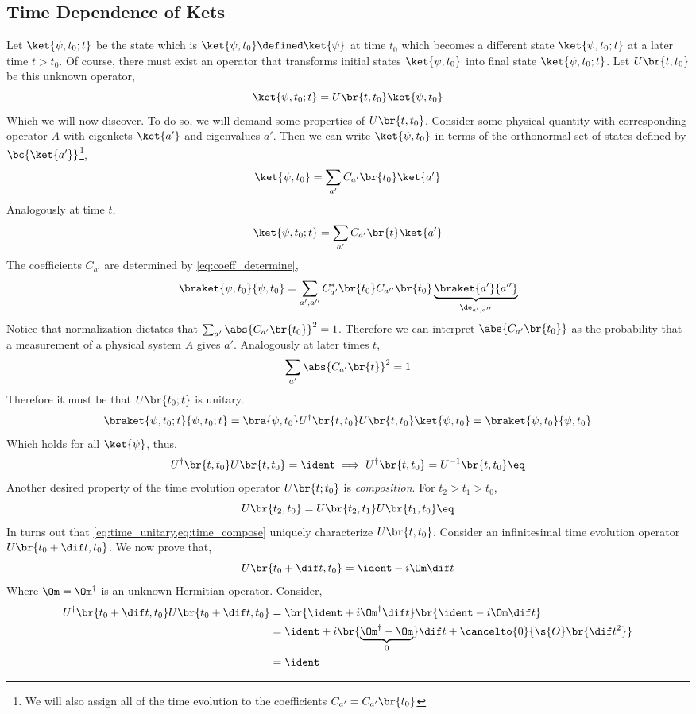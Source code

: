\documentclass{article}
\begin{document}
\subsection{Time Dependence of Kets}
Let $\ket{\psi, t_0; t}$ be the state which is $\ket{\psi, t_0} \defined \ket{\psi}$ at time $t_0$ which becomes a different state $\ket{\psi, t_0; t}$ at a later time $t > t_0$. Of course, there must exist an operator that transforms initial states $\ket{\psi, t_0}$ into final state $\ket{\psi, t_0; t}$. Let $U\br{t, t_0}$ be this unknown operator,
\[ \ket{\psi, t_0; t} = U\br{t, t_0} \ket{\psi, t_0} \]
Which we will now discover. To do so, we will demand some properties of $U\br{t, t_0}$. Consider some physical quantity with corresponding operator $A$ with eigenkets $\ket{a'}$ and eigenvalues $a'$. Then we can write $\ket{\psi, t_0}$ in terms of the orthonormal set of states defined by $\bc{\ket{a'}}$\footnote{We will also assign all of the time evolution to the coefficients $C_{a'} = C_{a'}\br{t_0}$},
\[ \ket{\psi, t_0} = \sum_{a'} C_{a'}\br{t_0} \ket{a'} \]
Analogously at time $t$,
\[ \ket{\psi, t_0; t} = \sum_{a'} C_{a'}\br{t} \ket{a'} \]
The coefficients $C_{a'}$ are determined by \cref{eq:coeff_determine},
\[ \braket{\psi, t_0}{\psi, t_0} = \sum_{a', a''} C^{*}_{a'}\br{t_0}C_{a''}\br{t_0} \underbrace{\braket{a'}{a''}}_{\de_{a', a''}} \]
Notice that normalization dictates that $\sum_{a'} \abs{C_{a'}\br{t_0}}^2 = 1$. Therefore we can interpret $\abs{C_{a'}\br{t_0}}$ as the probability that a measurement of a physical system $A$ gives $a'$. Analogously at later times $t$,
\[ \sum_{a'}\abs{C_{a'}\br{t}}^2 = 1 \]
Therefore it must be that $U\br{t_0; t}$ is unitary.
\[ \braket{\psi, t_0; t}{\psi, t_0; t} = \bra{\psi, t_0} U^{\dagger}\br{t,t_0}U\br{t,t_0}\ket{\psi, t_0} = \braket{\psi, t_0}{\psi, t_0}\]
Which holds for all $\ket{\psi}$, thus,
\[ U^{\dagger}\br{t,t_0}U\br{t,t_0} = \ident \implies U^{\dagger}\br{t,t_0} = U^{-1}\br{t,t_0} \eq \label{eq:time_unitary} \]
Another desired property of the time evolution operator $U\br{t; t_0}$ is \textit{composition}. For $t_2 > t_1 > t_0$,
\[ U\br{t_2, t_0} = U\br{t_2, t_1} U\br{t_1, t_0} \eq \label{eq:time_compose}\]
In turns out that \cref{eq:time_unitary,eq:time_compose} uniquely characterize $U\br{t,t_0}$. Consider an infinitesimal time evolution operator $U\br{t_0+\dif t, t_0}$. We now prove that,
\[ U\br{t_0+\dif t, t_0} = \ident - i \Om \dif t \]
Where $\Om = \Om^{\dagger}$ is an unknown Hermitian operator. Consider,
\begin{align*}
U^{\dagger}\br{t_0+\dif t, t_0}U\br{t_0+\dif t, t_0} &= \br{\ident + i \Om^{\dagger} \dif t}\br{\ident - i \Om \dif t} \\
&= \ident + i \br{\underbrace{\Om^{\dagger} - \Om}_0} \dif t + \cancelto{0}{\s{O}\br{\dif t^2}} \\
&= \ident
\end{align*}
\end{document}
